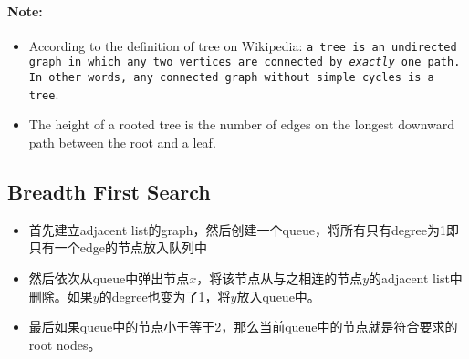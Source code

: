 \paragraph{Note:}

\begin{itemize}
\item According to the definition of tree on Wikipedia: \texttt{a tree is an undirected graph in which any two vertices are connected by \textit{exactly} one path. In other words, any connected graph without simple cycles is a tree}.
\item The height of a rooted tree is the number of edges on the longest downward path between the root and a leaf.
\end{itemize}
\subsection{Breadth First Search}
\begin{itemize}
\item 首先建立adjacent list的graph，然后创建一个queue，将所有只有degree为1即只有一个edge的节点放入队列中
\item 然后依次从queue中弹出节点$x$，将该节点从与之相连的节点$y$的adjacent list中删除。如果$y$的degree也变为了1，将$y$放入queue中。
\item 最后如果queue中的节点小于等于2，那么当前queue中的节点就是符合要求的root nodes。
\end{itemize}
\setcounter{lstlisting}{0}
